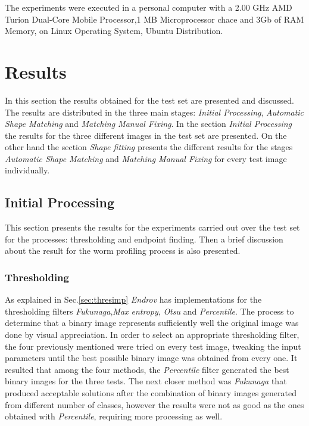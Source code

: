 The experiments were executed in a personal computer with a 2.00 GHz AMD Turion 
Dual-Core Mobile Processor,1 MB Microprocessor chace and 3Gb of RAM Memory, 
on Linux Operating System, Ubuntu Distribution.

\section{Results}
\label{sec:results}

In this section the results obtained for the test set are presented and discussed. The results are distributed in the three main stages: \emph{Initial Processing}, \emph{Automatic Shape Matching} and
\emph{Matching Manual Fixing}. In the section \emph{Initial Processing} the results for the three different 
images in the test set are presented. On the other hand the section \emph{Shape fitting} presents the different
results for the stages \emph{Automatic Shape Matching} and \emph{Matching Manual Fixing} for every test image
individually.

\subsection{Initial Processing}
\label{sec:initproc}

This section presents the results for the experiments carried out over the test set for the 
processes: thresholding and endpoint finding. Then a brief discussion about
the result for the worm profiling process is also presented.

\subsubsection*{Thresholding}

As explained in Sec.\ref{sec:thresimp} \emph{Endrov} has implementations for the 
thresholding filters \emph{Fukunaga},\emph{Max entropy}, \emph{Otsu} and \emph{Percentile}.
The process to determine that a binary image represents sufficiently well the original 
image was done by visual appreciation. In order to select an appropriate thresholding
filter, the four previously mentioned were tried on every test image, tweaking the
input parameters until the best possible binary image was obtained from every one.
It resulted that among the four methods, the \emph{Percentile} filter generated the
best binary images for the three tests. The next closer method was \emph{Fukunaga}
that produced acceptable solutions after the combination of binary images
generated from different number of classes, however the results were not as good as
the ones obtained with \emph{Percentile}, requiring more processing as well.\\

